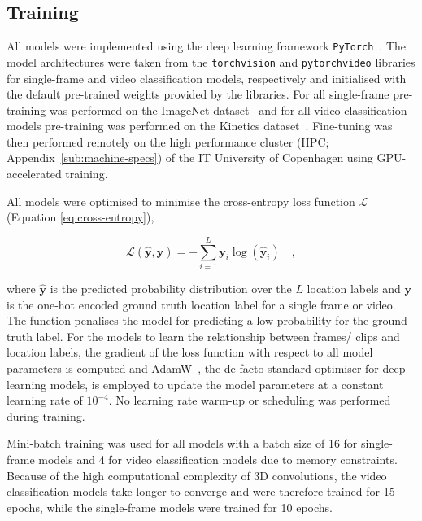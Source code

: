 \documentclass[a4paper]{article}
\begin{document}

\subsection{Training} %
\label{sub:training}

All models were implemented using the deep learning framework
\texttt{PyTorch}~\cite{pytorch}. The model architectures were taken from the
\texttt{torchvision} and \texttt{pytorchvideo} libraries for single-frame and
video classification models, respectively and initialised with the default
pre-trained weights provided by the libraries. For all single-frame pre-training
was performed on the ImageNet dataset~\cite{imagenet} and for all video
classification models pre-training was performed on the Kinetics
dataset~\cite{kinetics}. Fine-tuning was then performed remotely on the high
performance cluster (HPC; Appendix~\ref{sub:machine-specs}) of the IT University
of Copenhagen using GPU-accelerated training. 

All models were optimised to minimise the cross-entropy loss function
$\mathcal{L}$ (Equation \ref{eq:cross-entropy}), 

\begin{equation}
  \mathcal{L}(\hat{\mathbf{y}},\mathbf{y}) = -\sum_{i=1}^{L} \mathbf{y}_i
  \log(\hat{\mathbf{y}}_i) \quad ,
  \label{eq:cross-entropy}
\end{equation}




where $\hat{\mathbf{y}}$ is the predicted probability distribution over the $L$
location labels and $\mathbf{y}$ is the one-hot encoded ground truth location
label for a single frame or video. The function penalises the model for
predicting a low probability for the ground truth label. For the models to learn
the relationship between frames/ clips and location labels, the gradient of the
loss function with respect to all model parameters is computed and
AdamW~\cite{adamw}, the de facto standard optimiser for deep learning models, is
employed to update the model parameters at a constant learning rate of
$10^{-4}$. No learning rate warm-up or scheduling was performed during training.

Mini-batch training was used for all models with a batch size of 16 for
single-frame models and 4 for video classification models due to memory
constraints. Because of the high computational complexity of 3D convolutions,
the video classification models take longer to converge and were therefore
trained for 15 epochs, while the single-frame models were trained for 10 epochs.
\end{document}
